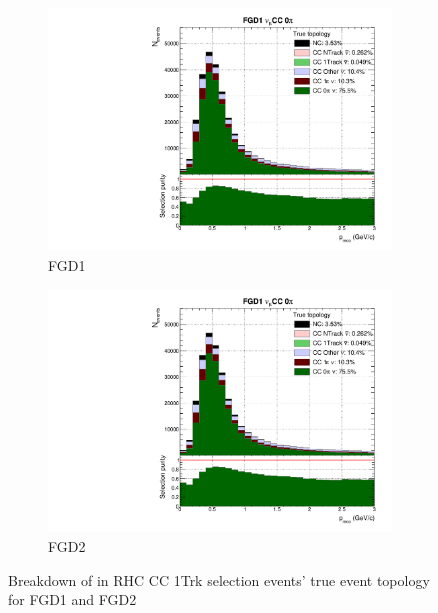 \begin{figure}[h]
	\begin{subfigure}[t]{0.49\textwidth}
		\includegraphics[width=\textwidth,page=21, trim={0mm 0mm 0mm 9mm}, clip]{figures/mach3/selection/2017b_Diag_WithSelection}
		\caption{FGD1}
	\end{subfigure}
	\begin{subfigure}[t]{0.49\textwidth}
		\includegraphics[width=\textwidth,page=25, trim={0mm 0mm 0mm 9mm}, clip]{figures/mach3/selection/2017b_Diag_WithSelection}
		\caption{FGD2}
	\end{subfigure}
	\caption{Breakdown of \numu in RHC CC 1Trk selection events' true event topology for FGD1 and FGD2 }
	\label{fig:ccnubarnu1trk_topology}
\end{figure}

